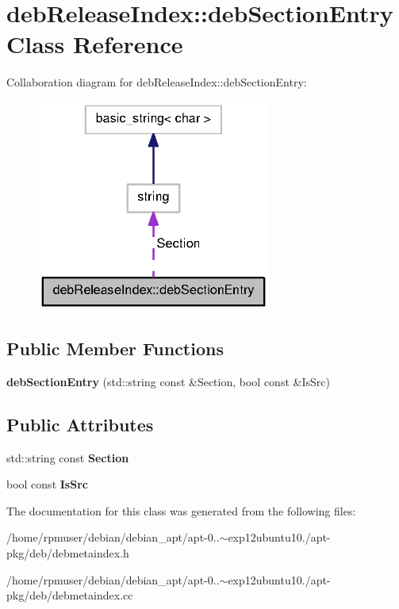 \section{deb\-Release\-Index\-:\-:deb\-Section\-Entry \-Class \-Reference}
\label{classdebReleaseIndex_1_1debSectionEntry}


\-Collaboration diagram for deb\-Release\-Index\-:\-:deb\-Section\-Entry\-:
\nopagebreak
\begin{figure}[H]
\begin{center}
\leavevmode
\includegraphics[width=218pt]{classdebReleaseIndex_1_1debSectionEntry__coll__graph}
\end{center}
\end{figure}
\subsection*{\-Public \-Member \-Functions}
\begin{DoxyCompactItemize}
\item 
{\bfseries deb\-Section\-Entry} (std\-::string const \&\-Section, bool const \&\-Is\-Src)\label{classdebReleaseIndex_1_1debSectionEntry_a3944a47116dc65321d49e7f0afa7bb4a}

\end{DoxyCompactItemize}
\subsection*{\-Public \-Attributes}
\begin{DoxyCompactItemize}
\item 
std\-::string const {\bfseries \-Section}\label{classdebReleaseIndex_1_1debSectionEntry_a1f4483801b554c67c273faf8703e26a8}

\item 
bool const {\bfseries \-Is\-Src}\label{classdebReleaseIndex_1_1debSectionEntry_a3ce0c20623b23495675f34651b0a287f}

\end{DoxyCompactItemize}


\-The documentation for this class was generated from the following files\-:\begin{DoxyCompactItemize}
\item 
/home/rpmuser/debian/debian\-\_\-apt/apt-\/0..$\sim$exp12ubuntu10./apt-\/pkg/deb/debmetaindex.\-h\item 
/home/rpmuser/debian/debian\-\_\-apt/apt-\/0..$\sim$exp12ubuntu10./apt-\/pkg/deb/debmetaindex.\-cc\end{DoxyCompactItemize}
